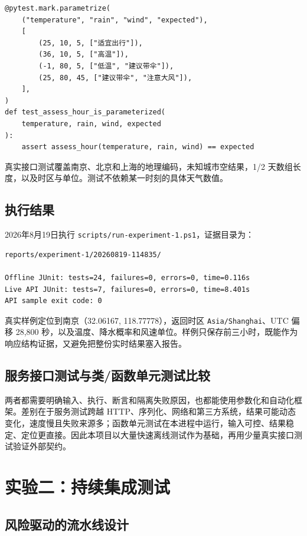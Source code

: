 \documentclass[UTF8,zihao=-4,a4paper]{ctexart}
\newcommand{\code}[1]{\texttt{#1}}
\begin{document}
\begin{lstlisting}[style=pythonstyle]
@pytest.mark.parametrize(
    ("temperature", "rain", "wind", "expected"),
    [
        (25, 10, 5, ["适宜出行"]),
        (36, 10, 5, ["高温"]),
        (-1, 80, 5, ["低温", "建议带伞"]),
        (25, 80, 45, ["建议带伞", "注意大风"]),
    ],
)
def test_assess_hour_is_parameterized(
    temperature, rain, wind, expected
):
    assert assess_hour(temperature, rain, wind) == expected
\end{lstlisting}

真实接口测试覆盖南京、北京和上海的地理编码，未知城市空结果，1/2 天数组长度，以及时区与单位。测试不依赖某一时刻的具体天气数值。

\subsection{执行结果}

2026年8月19日执行 \code{scripts/run-experiment-1.ps1}，证据目录为：

\begin{lstlisting}[style=shellstyle]
reports/experiment-1/20260819-114835/

Offline JUnit: tests=24, failures=0, errors=0, time=0.116s
Live API JUnit: tests=7, failures=0, errors=0, time=8.401s
API sample exit code: 0
\end{lstlisting}

真实样例定位到南京（32.06167, 118.77778），返回时区 \code{Asia/Shanghai}、UTC 偏移 28,800 秒，以及温度、降水概率和风速单位。样例只保存前三小时，既能作为响应结构证据，又避免把整份实时结果塞入报告。

\subsection{服务接口测试与类/函数单元测试比较}

两者都需要明确输入、执行、断言和隔离失败原因，也都能使用参数化和自动化框架。差别在于服务测试跨越 HTTP、序列化、网络和第三方系统，结果可能动态变化，速度慢且失败来源多；函数单元测试在本进程中运行，输入可控、结果稳定、定位更直接。因此本项目以大量快速离线测试作为基础，再用少量真实接口测试验证外部契约。

\section{实验二：持续集成测试}

\subsection{风险驱动的流水线设计}
\end{document}
